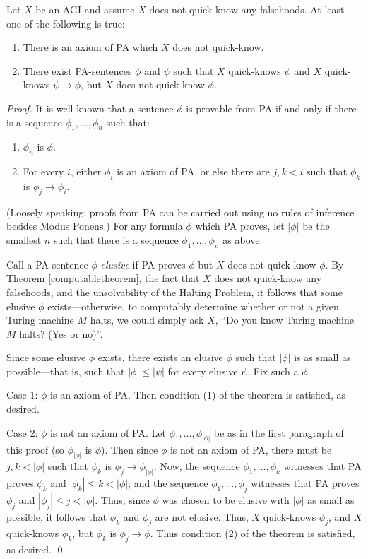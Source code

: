 \documentclass[runningheads]{llncs}
\begin{document}
\begin{theorem}
\label{badnesstheorem}
Let $X$ be an AGI and assume $X$ does not quick-know any falsehoods.
At least one of the following is true:
\begin{enumerate}
  \item There is an axiom of PA which $X$ does not quick-know.
  \item There exist PA-sentences $\phi$ and $\psi$
  such that $X$ quick-knows $\psi$ and $X$ quick-knows $\psi\rightarrow\phi$,
  but $X$ does not quick-know $\phi$.
\end{enumerate}
\end{theorem}

\begin{proof}
  It is well-known that a sentence $\phi$ is provable from PA if and only
  if there is a sequence $\phi_1,\ldots,\phi_n$ such that:
  \begin{enumerate}
    \item $\phi_n$ is $\phi$.
    \item For every $i$, either $\phi_i$ is an axiom of PA, or else there
    are $j,k<i$ such that $\phi_k$ is $\phi_j\rightarrow \phi_i$.
  \end{enumerate}
  (Loosely speaking: proofs from PA can be carried out using no rules
  of inference besides Modus Ponens.)
  For any formula $\phi$ which PA proves, let $|\phi|$ be the smallest
  $n$ such that there is a sequence $\phi_1,\ldots,\phi_n$ as above.

  Call a PA-sentence $\phi$ \emph{elusive} if PA proves $\phi$ but $X$ does not
  quick-know $\phi$. By Theorem \ref{computabletheorem}, the fact that $X$ does
  not quick-know any falsehoods, and the unsolvability of the Halting Problem,
  it follows that some elusive $\phi$ exists---otherwise, to computably determine whether
  or not a given Turing machine $M$ halts, we could simply ask $X$, ``Do you know
  Turing machine $M$ halts? (Yes or no)''.

  Since some elusive $\phi$ exists, there exists an elusive $\phi$ such that $|\phi|$
  is as small as possible---that is, such that $|\phi|\leq |\psi|$ for every
  elusive $\psi$. Fix such a $\phi$.

  Case 1: $\phi$ is an axiom of PA. Then condition (1) of the theorem is
  satisfied, as desired.

  Case 2: $\phi$ is not an axiom of PA.
  Let $\phi_1,\ldots,\phi_{|\phi|}$ be as in the first paragraph of this proof
  (so $\phi_{|\phi|}$ is $\phi$).
  Then since $\phi$ is not an axiom of PA,
  there must be $j,k<|\phi|$ such that $\phi_k$ is $\phi_j\rightarrow \phi_{|\phi|}$.
  Now, the sequence $\phi_1,\ldots,\phi_k$ witnesses that PA
  proves $\phi_k$ and $|\phi_k|\leq k<|\phi|$; and the
  sequence $\phi_1,\ldots,\phi_j$ witnesses that PA proves
  $\phi_j$ and $|\phi_j|\leq j<|\phi|$.
  Thus, since $\phi$ was chosen to be elusive with $|\phi|$ as small as possible,
  it follows that $\phi_k$ and $\phi_j$ are not elusive.
  Thus, $X$ quick-knows $\phi_j$, and $X$ quick-knows $\phi_k$,
  but $\phi_k$ is $\phi_j\rightarrow\phi$. Thus condition (2) of the theorem is
  satisfied, as desired.
  \qed
\end{proof}
\end{document}

